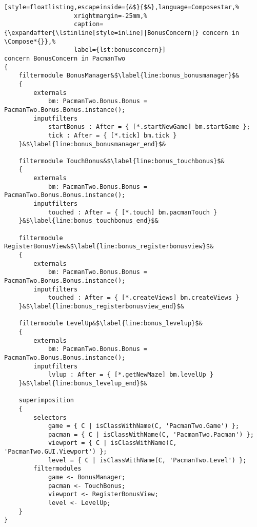 \begin{lstlisting}[style=floatlisting,escapeinside={&$}{$&},language=Composestar,%
                   xrightmargin=-25mm,%
                   caption={\expandafter{\lstinline[style=inline]|BonusConcern|} concern in \Compose*{}},%
                   label={lst:bonusconcern}]
concern BonusConcern in PacmanTwo
{
	filtermodule BonusManager&$\label{line:bonus_bonusmanager}$&
	{
		externals
			bm: PacmanTwo.Bonus.Bonus = PacmanTwo.Bonus.Bonus.instance();
		inputfilters
			startBonus : After = { [*.startNewGame] bm.startGame };
			tick : After = { [*.tick] bm.tick }
	}&$\label{line:bonus_bonusmanager_end}$&

	filtermodule TouchBonus&$\label{line:bonus_touchbonus}$&
	{
		externals
			bm: PacmanTwo.Bonus.Bonus = PacmanTwo.Bonus.Bonus.instance();
		inputfilters
			touched : After = { [*.touch] bm.pacmanTouch }
	}&$\label{line:bonus_touchbonus_end}$&

	filtermodule RegisterBonusView&$\label{line:bonus_registerbonusview}$&
	{
		externals
			bm: PacmanTwo.Bonus.Bonus = PacmanTwo.Bonus.Bonus.instance();
		inputfilters
			touched : After = { [*.createViews] bm.createViews }
	}&$\label{line:bonus_registerbonusview_end}$&

	filtermodule LevelUp&$\label{line:bonus_levelup}$&
	{
		externals
			bm: PacmanTwo.Bonus.Bonus = PacmanTwo.Bonus.Bonus.instance();
		inputfilters
			lvlup : After = { [*.getNewMaze] bm.levelUp }
	}&$\label{line:bonus_levelup_end}$&

	superimposition
	{
		selectors
			game = { C | isClassWithName(C, 'PacmanTwo.Game') };
			pacman = { C | isClassWithName(C, 'PacmanTwo.Pacman') };
			viewport = { C | isClassWithName(C, 'PacmanTwo.GUI.Viewport') };
			level = { C | isClassWithName(C, 'PacmanTwo.Level') };
		filtermodules
			game <- BonusManager;
			pacman <- TouchBonus;
			viewport <- RegisterBonusView;
			level <- LevelUp;
	}
}
\end{lstlisting}

